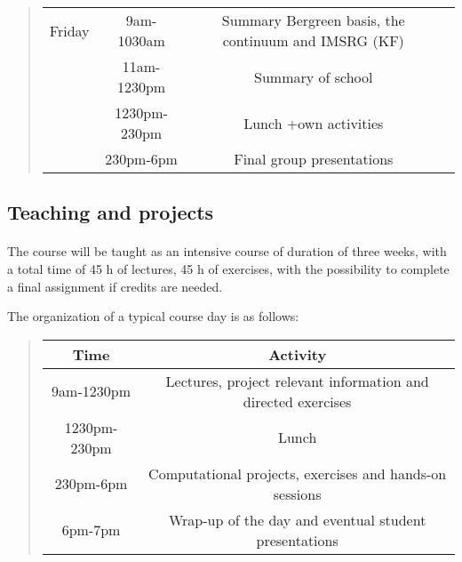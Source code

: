 \documentclass[%
oneside,                 %
final,                   %
10pt]{article}
\begin{document}
\begin{quote}
\begin{tabular}{cccc}
\hline
Friday    & 9am-1030am   & Summary Bergreen basis, the continuum and IMSRG (KF) &                                                              \\
          & 11am-1230pm  & Summary of school                                    &                                                              \\
          & 1230pm-230pm & Lunch +own activities                                &                                                              \\
          & 230pm-6pm    & Final group presentations                            &                                                              \\
\hline
\end{tabular}
\end{quote}

\noindent




\subsection{Teaching and projects}

\paragraph{}

The course will be taught as an intensive  course of duration of three weeks, with a
total time of 45 h of lectures, 45 h of exercises, with the possibility to complete a final assignment if credits are needed.

The organization of a typical course day is as follows:


\begin{quote}
\begin{tabular}{cc}
\hline
\multicolumn{1}{c}{ Time } & \multicolumn{1}{c}{ Activity } \\
\hline
9am-1230pm   & Lectures, project relevant information and directed exercises \\
1230pm-230pm & Lunch                                                         \\
230pm-6pm    & Computational projects, exercises  and hands-on sessions      \\
6pm-7pm      & Wrap-up of the day and eventual student presentations         \\
\hline
\end{tabular}
\end{quote}
\end{document}
